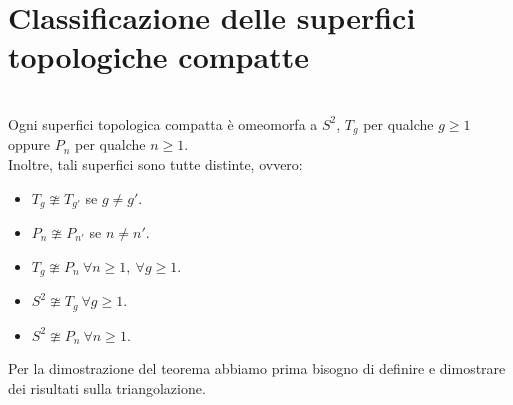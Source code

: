 \section{Classificazione delle superfici topologiche compatte}
\begin{theorema}~{}\label{classificazionesuperficicompatte}\\
Ogni superfici topologica compatta è omeomorfa a $S^2$, $T_g$ per qualche $g\geq 1$ oppure $P_n$ per qualche $n\geq 1$.\\
Inoltre, tali superfici sono tutte distinte, ovvero:
\begin{itemize}
	\item $T_g\ncong T_{g'}$ se $g\neq g'$.
	\item $P_n\ncong P_{n'}$ se $n\neq n'$.
	\item $T_g\ncong P_{n}\ \forall n\geq 1,\ \forall g\geq 1$.
	\item $S^2\ncong T_g\ \forall g\geq 1$.
	\item $S^2\ncong P_n\ \forall n\geq 1$.
\end{itemize}
\vspace{-3mm}
\end{theorema}
Per la dimostrazione del teorema abbiamo prima bisogno di definire e dimostrare dei risultati sulla triangolazione.
